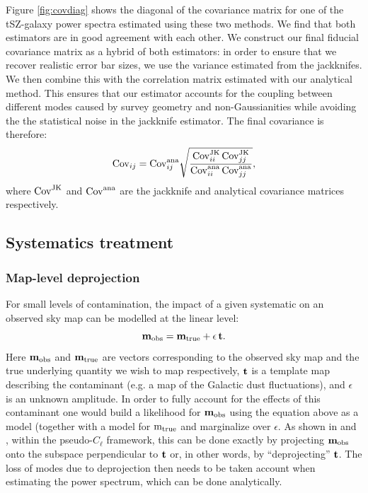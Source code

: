 \documentclass[useAMS,usenatbib]{mn2e}
\begin{document}
    Figure \ref{fig:covdiag} shows the diagonal of the covariance matrix for one of the tSZ-galaxy power spectra estimated using these two methods. We find that both estimators are in good agreement with each other. We construct our final fiducial covariance matrix as a hybrid of both estimators: in order to ensure that we recover realistic error bar sizes, we use the variance estimated from the jackknifes. We then combine this with the correlation matrix estimated with our analytical method. This ensures that our estimator accounts for the coupling between different modes caused by survey geometry and non-Gaussianities while avoiding the the statistical noise in the jackknife estimator. The final covariance is therefore:
    \begin{equation}
      {\rm Cov}_{ij} = {\rm Cov}^{\rm ana}_{ij} \sqrt{\frac{{\rm Cov}^{\rm JK}_{ii}\,{\rm Cov}^{\rm JK}_{jj}}{{\rm Cov}^{\rm ana}_{ii}\,{\rm Cov}^{\rm ana}_{jj}}},
    \end{equation}
    where ${\rm Cov}^{\rm JK}$ and ${\rm Cov}^{\rm ana}$ are the jackknife and analytical covariance matrices respectively.

  \subsection{Systematics treatment}\label{ssec:methods.syst}
    \subsubsection{Map-level deprojection}\label{sssec:methods.syst.deproj}
      For small levels of contamination, the impact of a given systematic on an observed sky map can be modelled at the linear level:
      \begin{equation}
        {\bf m}_{\rm obs}={\bf m}_{\rm true} + \epsilon\,{\bf t}.
      \end{equation}
      Here ${\bf m}_{\rm obs}$ and ${\bf m}_{\rm true}$ are vectors corresponding to the observed sky map and the true underlying quantity we wish to map respectively, ${\bf t}$ is a template map describing the contaminant (e.g. a map of the Galactic dust fluctuations), and $\epsilon$ is an unknown amplitude. In order to fully account for the effects of this contaminant one would build a likelihood for ${\bf m}_{\rm obs}$ using the equation above as a model (together with a model for ${\rm m}_{\rm true}$ and marginalize over $\epsilon$. As shown in \cite{2017MNRAS.465.1847E} and \cite{2019MNRAS.484.4127A}, within the pseudo-$C_\ell$ framework, this can be done exactly by projecting ${\bf m}_{\rm obs}$ onto the subspace perpendicular to ${\bf t}$ or, in other words, by ``deprojecting'' ${\bf t}$. The loss of modes due to deprojection then needs to be taken account when estimating the power spectrum, which can be done analytically.
\end{document}
